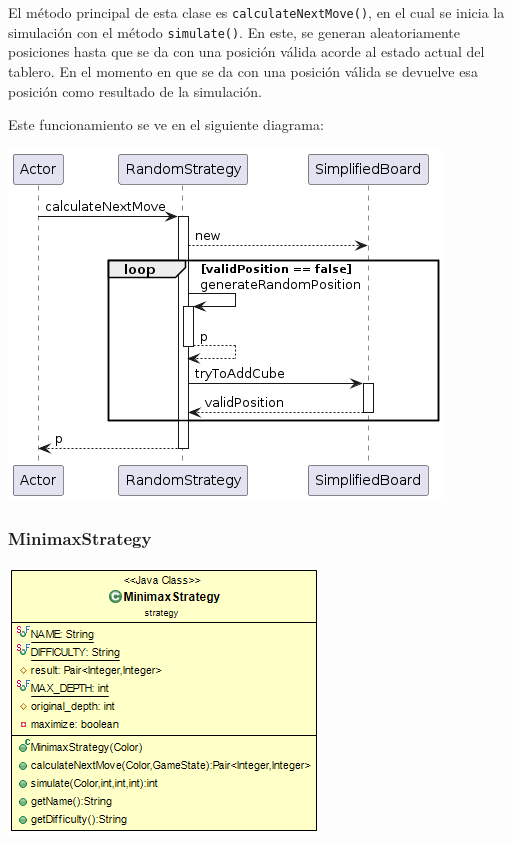 \documentclass[12pt,a4paper,openright]{book}
\theoremstyle{break}
\begin{document}
El método principal de esta clase es \texttt{calculateNextMove()}, en el cual se inicia la simulación con el método \texttt{simulate()}. En este, se generan aleatoriamente posiciones hasta que se da con una posición válida acorde al estado actual del tablero. En el momento en que se da con una posición válida se devuelve esa posición como resultado de la simulación.

Este funcionamiento se ve en el siguiente diagrama:

\begin{center}
\includegraphics[scale=0.75]{RandomStrategy.calculateNextMove()-sprint7.png} 
\end{center}

\newpage

\subsubsection{MinimaxStrategy}

\begin{center}
\includegraphics[scale=0.75]{MinimaxStrategy-sprint7.png} 
\end{center}
\end{document}
